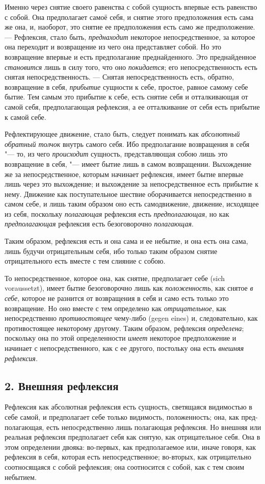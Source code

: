 Именно через снятие своего равенства с собой сущность впервые есть равенство
с собой. Она предполагает самоё себя, и снятие этого предположения есть
сама же она, и, наоборот, это снятие ее предположения есть само же
предположение. --- Рефлексия, стало быть,
{\em преднаходит} некоторое непосредственное, за
которое она переходит и возвращение из чего она представляет собой. Но это
возвращение впервые и есть предполагание преднайденного. Это преднайденное
{\em становится} лишь в силу того, что оно
{\em покидается}; его непосредственность есть снятая
непосредственность. --- Снятая непосредственность есть, обратно, возвращение
в себя, {\em прибытие} сущности к себе, простое, равное
самому себе бытие. Тем самым это прибытие к себе, есть снятие себя и
отталкивающая от самой себя, предполагающая рефлексия, а ее отталкивание от
себя есть прибытие к самой себе.

Рефлектирующее движение, стало быть, следует понимать как
{\em абсолютный обратный толчок} внутрь самого себя.
Ибо предполагание возвращения в себя "--- то, из чего
{\em происходит} сущность, представляющая собою лишь
это возвращение в себя, "--- имеет бытие лишь в самом возвращении. Выхождение
же за непосредственное, которым начинает рефлексия, имеет бытие впервые
лишь через это выхождение; и выхождение за непосредственное есть прибытие к
нему. Движение как поступательное шествие оборачивается непосредственно в
самом себе, и лишь таким образом оно есть самодвижение, движение, исходящее
из себя, поскольку {\em полагающая} рефлексия есть
{\em предполагающая}, но как
{\em предполагающая} рефлексия есть безоговорочно
{\em полагающая}.

Таким образом, рефлексия есть и она сама и ее небытие, и она есть она сама,
лишь будучи отрицательным себя, ибо только таким образом снятие
отрицательного есть вместе с тем слияние с собою.

То непосредственное, которое она, как снятие, предполагает себе (sich
voraussetzt), имеет бытие безоговорочно лишь как
{\em положенность}, как снятое
{\em в себе}, которое не разнится от возвращения в себя
и само есть только это возвращение. Но оно вместе с тем определено как
{\em отрицательное}, как непосредственно
{\em противостоящее} чему-либо (gegen eines) и,
следовательно, как противостоящее некоторому другому. Таким образом,
рефлексия {\em определена}; поскольку она по этой
определенности {\em имеет} некоторое предположение и
начинает с непосредственного, как с ее другого, постольку она есть
{\em внешняя рефлексия}.

\subsection[2. Внешняя рефлексия]{2. Внешняя рефлексия}
Рефлексия как абсолютная рефлексия есть
сущность, светящаяся видимостью в себе самой, и предполагает себе только
видимость, положенность; она, как пред-полагающая, есть непосредственно
лишь полагающая рефлексия. Но внешняя или реальная рефлексия предполагает
себя как снятую, как отрицательное себя. Она в этом определении двояка:
во-первых, как предполагаемое или, иначе говоря, как рефлексия в себя,
которая есть непосредственное; во-вторых, как отрицательно соотносящаяся с
собой рефлексия; она соотносится с собой, как с тем своим небытием.


